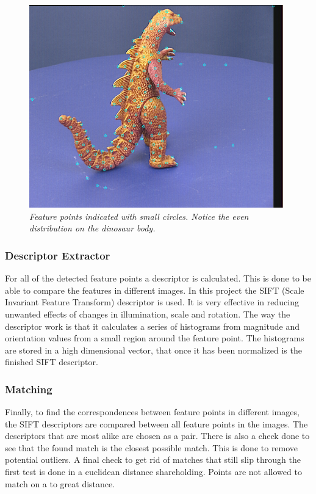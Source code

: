 \begin{figure}[htb]
	\centering
	\includegraphics[width=110mm]{images/FeatureDetection.png}
	\caption{\textit{Feature points indicated with small circles. Notice the even distribution on the dinosaur body.}}
	\label{fig:FeaturePoints} %
\end{figure}

\subsubsection{Descriptor Extractor}
For all of the detected feature points a descriptor is calculated. This is done to be able to compare the features in different images. In this project the SIFT (Scale Invariant Feature Transform) descriptor is used. It is very effective in reducing unwanted effects of changes in illumination, scale and rotation. The way the descriptor work is that it calculates a series of histograms from magnitude and orientation values from a small region around the feature point. The histograms are stored in a high dimensional vector, that once it has been normalized is the finished SIFT descriptor.

\subsubsection{Matching}
Finally, to find the correspondences between feature points in different images, the SIFT descriptors are compared between all feature points in the images. The descriptors that are most alike are chosen as a pair. There is also a check done to see that the found match is the closest possible match. This is done to remove potential outliers. A final check to get rid of matches that still slip through the first test is done in a euclidean distance shareholding. Points are not allowed to match on a to great distance.

